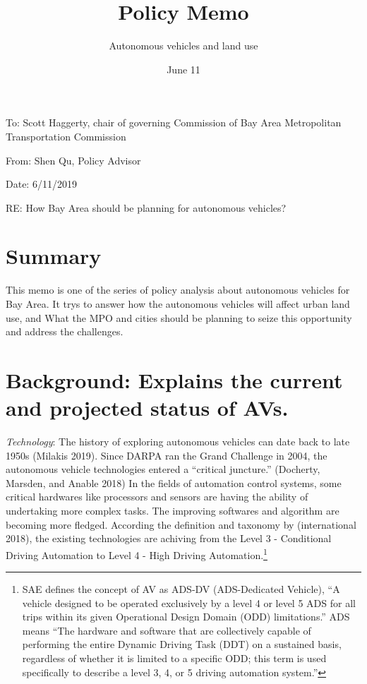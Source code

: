 \documentclass[12pt,]{article}
\title{Policy Memo}
\subtitle{Autonomous vehicles and land use}
\author{}
\date{June 11}
\let\rmarkdownfootnote\footnote%
\def\footnote{\protect\rmarkdownfootnote}
\begin{document}
\maketitle

To: Scott Haggerty, chair of governing Commission of Bay Area
Metropolitan Transportation Commission

From: Shen Qu, Policy Advisor

Date: 6/11/2019

RE: How Bay Area should be planning for autonomous vehicles?

\hypertarget{summary}{%
\section{Summary}\label{summary}}

This memo is one of the series of policy analysis about autonomous
vehicles for Bay Area. It trys to answer how the autonomous vehicles
will affect urban land use, and What the MPO and cities should be
planning to seize this opportunity and address the challenges.

\hypertarget{background-explains-the-current-and-projected-status-of-avs.}{%
\section{Background: Explains the current and projected status of
AVs.}\label{background-explains-the-current-and-projected-status-of-avs.}}

\emph{Technology}: The history of exploring autonomous vehicles can date
back to late 1950s (Milakis 2019). Since DARPA ran the Grand Challenge
in 2004, the autonomous vehicle technologies entered a ``critical
juncture.'' (Docherty, Marsden, and Anable 2018) In the fields of
automation control systems, some critical hardwares like processors and
sensors are having the ability of undertaking more complex tasks. The
improving softwares and algorithm are becoming more fledged. According
the definition and taxonomy by (international 2018), the existing
technologies are achiving from the Level 3 - Conditional Driving
Automation to Level 4 - High Driving Automation.\footnote{SAE defines
  the concept of AV as ADS-DV (ADS-Dedicated Vehicle), ``A vehicle
  designed to be operated exclusively by a level 4 or level 5 ADS for
  all trips within its given Operational Design Domain (ODD)
  limitations.'' ADS means ``The hardware and software that are
  collectively capable of performing the entire Dynamic Driving Task
  (DDT) on a sustained basis, regardless of whether it is limited to a
  specific ODD; this term is used specifically to describe a level 3, 4,
  or 5 driving automation system.''}
\end{document}
